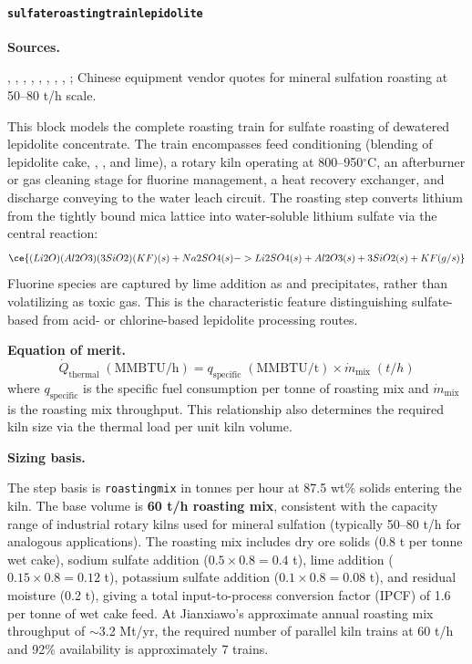 \documentclass{article}
\renewcommand\_{\textunderscore\allowbreak}
\begin{document}
\clearpage
\paragraph{\texttt{sulfate\_roasting\_train\_lepidolite}}\label{app:04-methods-blockdefs-sulfateroasting}\leavevmode\par

\medskip
\noindent\textbf{Sources.}\quad

\citet{dengSystematicReviewSulfate2026}, \citet{yanExtractionLithiumLepidolite2012}, \citet{gaoLithiumExtractionHard2023}, \citet{parkEffectiveLithiumExtraction2023}, \citet{nanMethodsExtractingLithium2019}, \citet{nanMethodsExtractingLithium2022}, \citet{zouMethodEfficientLithium2024}, \citet{jiaoKeyTechnologiesDevelopment2024}, \citet{garrettHandbookLithiumNatural2004}; Chinese equipment vendor quotes for mineral sulfation roasting at 50--80 t/h scale.

This block models the complete roasting train for sulfate roasting of dewatered lepidolite concentrate. The train encompasses feed conditioning (blending of lepidolite cake, , , and lime), a rotary kiln operating at 800--950$^\circ$C, an afterburner or gas cleaning stage for fluorine management, a heat recovery exchanger, and discharge conveying to the water leach circuit. The roasting step converts lithium from the tightly bound mica lattice into water-soluble lithium sulfate via the central reaction:
\begin{equation}
    \ce{(Li2O)(Al2O3)(3SiO2)(KF)(s) + Na2SO4(s) ->
    Li2SO4(s) + Al2O3(s) + 3SiO2(s) + KF(g/s)}
\end{equation}
Fluorine species are captured by lime addition as  and  precipitates, rather than volatilizing as toxic  gas. This is the characteristic feature distinguishing sulfate-based from acid- or chlorine-based lepidolite processing routes.

\medskip
\noindent\textbf{Equation of merit.}\quad
\[
    \dot{Q}_\text{thermal}\;(\text{MMBTU/h}) = q_\text{specific}\;(\text{MMBTU/t}) \times \dot{m}_\text{mix}\;(\si{t/h})
\]
where $q_\text{specific}$ is the specific fuel consumption per tonne of roasting mix and $\dot{m}_\text{mix}$ is the roasting mix throughput. This relationship also determines the required kiln size via the thermal load per unit kiln volume.

\medskip
\noindent\textbf{Sizing basis.}\quad

The step basis is \texttt{roasting\_mix} in tonnes per hour at 87.5 wt\% solids entering the kiln. The base volume is \textbf{60 t/h roasting mix}, consistent with the capacity range of industrial rotary kilns used for mineral sulfation (typically 50--80 t/h for analogous applications). The roasting mix includes dry ore solids (0.8 t per tonne wet cake), sodium sulfate addition ($0.5 \times 0.8 = 0.4$ t), lime addition ($0.15 \times 0.8 = 0.12$ t), potassium sulfate addition ($0.1 \times 0.8 = 0.08$ t), and residual moisture (0.2 t), giving a total input-to-process conversion factor (IPCF) of 1.6 per tonne of wet cake feed. At Jianxiawo's approximate annual roasting mix throughput of $\sim$3.2 Mt/yr, the required number of parallel kiln trains at 60 t/h and 92\% availability is approximately 7 trains.
\end{document}
